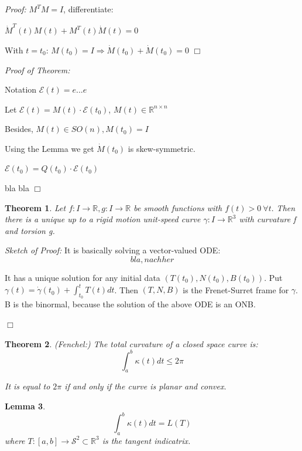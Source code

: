 \documentclass[a4paper,11pt,notitlepage,fullpage]{paper}
\newcommand{\dy}{\dot\gamma}
\theoremstyle{plain}
\newtheorem{thm}{Theorem}[section] %
\newtheorem{lem}[thm]{Lemma}
\theoremstyle{definition}
\begin{document}
\emph{Proof:} $M^TM = I$, differentiate:

$\dot M^T(t) M(t) + M^T(t) \dot M(t) = 0$

With $t = t_0$: $M(t_0) = I \Rightarrow \dot M(t_0) + \dot M(t_0) = 0$ \hfill $\Box$

\emph{Proof of Theorem:} 

Notation $\mathcal E(t) = e...e$

Let $\mathcal E(t) = M(t)\cdot\mathcal E(t_0)$, $M(t) \in \mathbb R^{n\times n}$

Besides, $M(t) \in SO(n), M(t_0) = I$

Using the Lemma we get $\dot M(t_0)$ is skew-symmetric.

$\mathcal E(t_0) = Q(t_0) \cdot \mathcal E(t_0)$

bla bla \hfill $\Box$


\begin{thm}
Let $f: I\to \mathbb R, g: I \to \mathbb R$ be smooth functions with $f(t) > 0 ~\forall t.$ Then there is a unique up to a rigid motion unit-speed curve $\gamma: I \to \mathbb R^3$ with curvature f and torsion g.
\end{thm}

\emph{Sketch of Proof:} It is basically solving a vector-valued ODE:
\begin{equation*}
bla, nachher
\end{equation*}

It has a unique solution for any initial data $(T(t_0), N(t_0), B(t_0))$. Put $\gamma(t) = \dy(t_0) + \int_{t_0}^t T(t) dt$. Then $(T, N, B)$ is the Frenet-Surret frame for $\gamma$. B is the binormal, because the solution of the above ODE is an ONB.

\hfill $\Box$

\begin{thm}
(Fenchel:) The total curvature of a closed space curve is:
\begin{equation*}
\int_a^b \kappa(t) dt \leq 2\pi
\end{equation*}

It is equal to $2\pi$ if and only if the curve is planar and convex.

\end{thm}

\begin{lem}
\begin{equation*}
\int_a^b \kappa(t) dt = L(T)
\end{equation*}
where $T:[a,b] \to \mathcal S^2 \subset \mathbb R^3$ is the \emph{tangent indicatrix}.
\end{lem}
\end{document}
